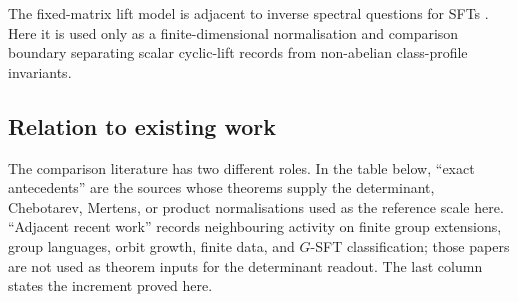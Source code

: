 The fixed-matrix lift model is adjacent to inverse spectral questions for
SFTs \cite{LindMarcus1995}.  Here it is used only as a finite-dimensional
normalisation and comparison boundary separating scalar cyclic-lift records
from non-abelian class-profile invariants.

\subsection{Relation to existing work}

The comparison literature has two different roles.  In the table below,
``exact antecedents'' are the sources whose theorems supply the determinant,
Chebotarev, Mertens, or product normalisations used as the reference scale
here.  ``Adjacent recent work'' records neighbouring activity on finite group
extensions, group languages, orbit growth, finite data, and \(G\)-SFT
classification; those papers are not used as theorem inputs for the
determinant readout.  The last column states the increment proved here.


